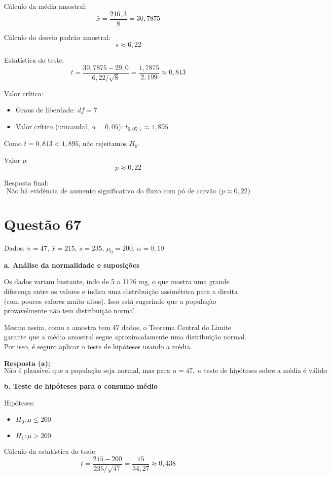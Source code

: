 \documentclass[12pt]{article}
\newcommand{\quest}[1]{\section*{Questão #1}} %
\begin{document}
Cálculo da média amostral:
\[
\bar{x} = \frac{246{,}3}{8} = 30{,}7875
\]

Cálculo do desvio padrão amostral:
\[
s \approx 6{,}22
\]

Estatística do teste:
\[
t = \frac{30{,}7875 - 29{,}0}{6{,}22 / \sqrt{8}} = \frac{1{,}7875}{2{,}199} \approx 0{,}813
\]

Valor crítico:
\begin{itemize}
  \item Graus de liberdade: $df = 7$
  \item Valor crítico (unicaudal, $\alpha = 0{,}05$): $t_{0{,}05; 7} \approx 1{,}895$
\end{itemize}

Como $t = 0{,}813 < 1{,}895$, não rejeitamos $H_0$.

Valor $p$:
\[
p \approx 0{,}22
\]

Resposta final:
\[
\boxed{\text{Não há evidência de aumento significativo do fluxo com pó de carvão ($p \approx 0{,}22$)}}
\]

\quest{67}

Dados: $n = 47$, $\bar{x} = 215$, $s = 235$, $\mu_0 = 200$, $\alpha = 0{,}10$

\textbf{a. Análise da normalidade e suposições}

Os dados variam bastante, indo de 5 a 1176 mg, o que mostra uma grande diferença entre os valores e indica uma distribuição assimétrica para a direita (com poucos valores muito altos). Isso está sugerindo que a população provavelmente não tem distribuição normal.

Mesmo assim, como a amostra tem 47 dados, o Teorema Central do Limite garante que a média amostral segue aproximadamente uma distribuição normal. Por isso, é seguro aplicar o teste de hipóteses usando a média.

\textbf{Resposta (a):}
\[
\boxed{\text{Não é plausível que a população seja normal, mas para } n = 47, \text{ o teste de hipóteses sobre a média é válido}}
\]

\textbf{b. Teste de hipóteses para o consumo médio}

Hipóteses:
\begin{itemize}
  \item $H_0: \mu \leq 200$
  \item $H_1: \mu > 200$
\end{itemize}

Cálculo da estatística do teste:
\[
t = \frac{215 - 200}{235 / \sqrt{47}} = \frac{15}{34{,}27} \approx 0{,}438
\]
\end{document}
